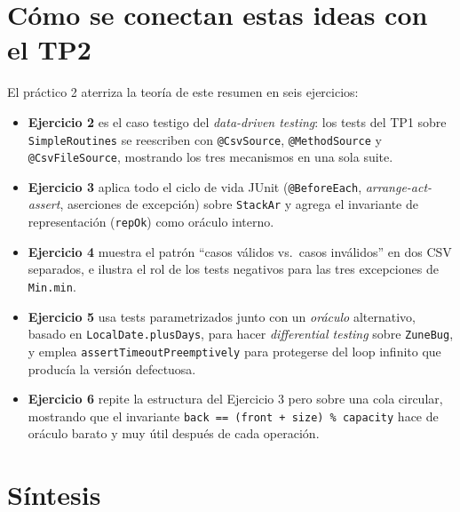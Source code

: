 \documentclass[12pt,a4paper]{article}
\begin{document}
\section{Cómo se conectan estas ideas con el TP2}

El práctico 2 aterriza la teoría de este resumen en seis ejercicios:

\begin{itemize}
  \item \textbf{Ejercicio 2} es el caso testigo del \textit{data-driven testing}: los tests del TP1 sobre \texttt{Simple\-Routines} se reescriben con \texttt{@CsvSource}, \texttt{@MethodSource} y \texttt{@CsvFileSource}, mostrando los tres mecanismos en una sola suite.
  \item \textbf{Ejercicio 3} aplica todo el ciclo de vida JUnit (\texttt{@BeforeEach}, \textit{arrange-act-assert}, aserciones de excepción) sobre \texttt{StackAr} y agrega el invariante de representación (\texttt{repOk}) como oráculo interno.
  \item \textbf{Ejercicio 4} muestra el patrón ``casos válidos vs.~casos inválidos'' en dos CSV separados, e ilustra el rol de los tests negativos para las tres excepciones de \texttt{Min.min}.
  \item \textbf{Ejercicio 5} usa tests parametrizados junto con un \textit{oráculo} alternativo, basado en \texttt{LocalDate.plusDays}, para hacer \textit{differential testing} sobre \texttt{Zune\-Bug}, y emplea \texttt{assert\-Timeout\-Preemptively} para protegerse del loop infinito que producía la versión defectuosa.
  \item \textbf{Ejercicio 6} repite la estructura del Ejercicio 3 pero sobre una cola circular, mostrando que el invariante \texttt{back == (front + size) \% capacity} hace de oráculo barato y muy útil después de cada operación.
\end{itemize}

\section{Síntesis}
\end{document}

